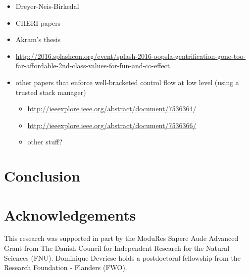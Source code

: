 \documentclass[compsoc,conference,letterpaper,fleqn]{IEEEtran}
\begin{document}
\begin{itemize}
\item Dreyer-Neis-Birkedal
\item CHERI papers
\item Akram's thesis
\item \url{http://2016.splashcon.org/event/splash-2016-oopsla-gentrification-gone-too-far-affordable-2nd-class-values-for-fun-and-co-effect}
\item other papers that enforce well-bracketed control flow at low level
(using a trusted stack manager)
\begin{itemize}
\item \url{http://ieeexplore.ieee.org/abstract/document/7536364/}
\item \url{http://ieeexplore.ieee.org/abstract/document/7536366/}
\item other stuff?
\end{itemize}
\end{itemize}

\section{Conclusion}

\section*{Acknowledgements}
\label{sec:acknowledgements}

This research was supported in part by the ModuRes Sapere Aude Advanced Grant from The Danish Council for Independent Research for the Natural Sciences (FNU).
Dominique Devriese holds a postdoctoral fellowship from the Research Foundation - Flanders (FWO).



\end{document}
